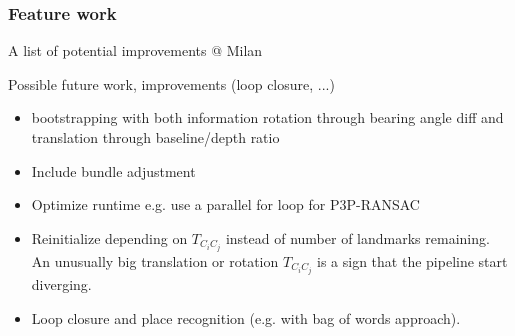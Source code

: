 \subsubsection{Feature work}
A list of potential improvements
\textcolor[rgb]{1,0,0}{@ Milan}

Possible future work, improvements (loop closure, ...)

\begin{itemize}
\item \colorbox[rgb]{1,0,0}{bootstrapping with both information rotation through bearing angle diff and translation through baseline/depth ratio}
\item Include bundle adjustment
\item Optimize runtime e.g. use a parallel for loop for P3P-RANSAC
\item Reinitialize depending on $T_{C_iC_j}$ instead of number of landmarks remaining. An unusually big translation or rotation $T_{C_iC_j}$ is a sign that the pipeline start diverging.
\item Loop closure and place recognition (e.g. with bag of words approach).
\end{itemize}
